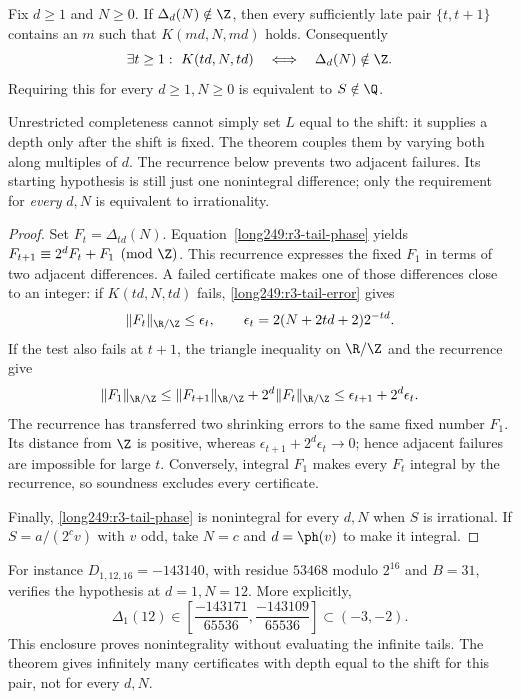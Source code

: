 \begin{theorem}\label{res:fulldepth}
Fix $d\ge1$ and $N\ge0$. If $\Delta_d(N)\notin\Z$, then every sufficiently
late pair $\{t,t+1\}$ contains an $m$ such that $K(md,N,md)$ holds.
Consequently
\[
 \exists t\ge1:\ K(td,N,td)
 \quad\Longleftrightarrow\quad\Delta_d(N)\notin\Z.
\]
Requiring this for every $d\ge1,N\ge0$ is equivalent to $S\notin\Q$.
\end{theorem}
Unrestricted completeness cannot simply set $L$ equal to the shift:
it supplies a depth only after the shift is fixed. The theorem couples
them by varying both along multiples of $d$. The recurrence below
prevents two adjacent failures. Its starting hypothesis is still just
one nonintegral difference; only the requirement for \emph{every}
$d,N$ is equivalent to irrationality.

\begin{proof}
Set $F_t=\Delta_{td}(N)$. Equation~\eqref{long249:r3-tail-phase} yields
$F_{t+1}\equiv2^dF_t+F_1\pmod\Z$. This recurrence expresses the fixed
$F_1$ in terms of two adjacent differences. A failed certificate makes
one of those differences close to an integer: if $K(td,N,td)$ fails,
\eqref{long249:r3-tail-error} gives
\[
 \|F_t\|_{\R/\Z}\le\epsilon_t,
 \qquad \epsilon_t=2(N+2td+2)2^{-td}.
\]
If the test also fails at $t+1$, the triangle inequality on $\R/\Z$
and the recurrence give
\[
 \|F_1\|_{\R/\Z}
 \le \|F_{t+1}\|_{\R/\Z}+2^d\|F_t\|_{\R/\Z}
 \le\epsilon_{t+1}+2^d\epsilon_t.
\]
The recurrence has transferred two shrinking errors to the same
fixed number $F_1$. Its distance from $\Z$ is positive, whereas
$\epsilon_{t+1}+2^d\epsilon_t\to0$; hence adjacent failures are
impossible for large $t$. Conversely, integral $F_1$ makes every
$F_t$ integral by the recurrence, so soundness excludes every certificate.

Finally, \eqref{long249:r3-tail-phase} is
nonintegral for every $d,N$ when $S$ is irrational. If
$S=a/(2^cv)$ with $v$ odd, take $N=c$ and $d=\ph(v)$ to make it integral.
\end{proof}
For instance $D_{1,12,16}=-143140$, with residue $53468$ modulo $2^{16}$
and $B=31$, verifies the hypothesis at $d=1,N=12$. More explicitly,
\[
 \Delta_1(12)\in
 \left[\frac{-143171}{65536},\frac{-143109}{65536}\right]
 \subset(-3,-2).
\]
This enclosure proves nonintegrality without evaluating the infinite
tails. The theorem gives infinitely many certificates with depth equal
to the shift for this pair, not for every $d,N$.

